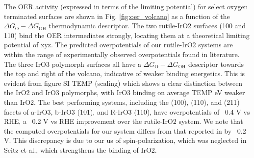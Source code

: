 The OER activity (expressed in terms of the limiting potential) for select oxygen terminated surfaces are shown in Fig. \ref{fig:oer_volcano} as a function of the $\Delta G_\mathrm{O} - \Delta G_\mathrm{OH}$ thermodynamic descriptor.
%
The two rutile-IrO2 surfaces (100 and 110) bind the OER intermediates strongly, locating them at a theoretical limiting potential of xyz.
%
The predicted overpotentials of our rutile-IrO2 systems are within the range of experimentally observed overpotentials found in literature.
%
The three IrO3 polymorph surfaces all have a $\Delta G_\mathrm{O} - \Delta G_\mathrm{OH}$ descriptor towards the top and right of the volcano, indicative of weaker binding energetics.
%
This is evident from figure SI TEMP (scaling) which shows a clear distinction between the IrO2 and IrO3 polymorphs, with IrO3 binding on average TEMP eV weaker than IrO2.
%
The best performing systems, including the (100), (110), and (211) facets of a-IrO3, b-IrO3 (101), and R-IrO3 (110), have overpotentials of ~0.4 V vs RHE,
a ~0.2 V vs RHE improvement over the rutile-IrO2 system.
%
We note that the computed  overpotentials for our \rIrOtwo system differs from that reported in \cite{Seitz2016} by ~0.2 V. This discrepancy is due to our us of spin-polarization, which was neglected in Seitz et al., which strengthens the binding of IrO2.

